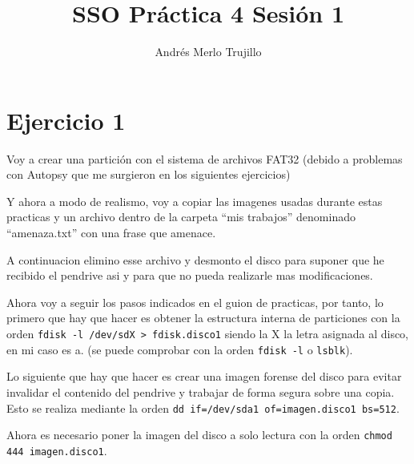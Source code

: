 \documentclass{article}
\title{SSO Práctica 4 Sesión 1}
\author{Andrés Merlo Trujillo}
\date{}
\begin{document}
\maketitle

\tableofcontents

\newpage

\section*{Ejercicio 1}

Voy a crear una partición con el sistema de archivos FAT32 (debido a problemas con Autopsy que me surgieron en los siguientes ejercicios)

Y ahora a modo de realismo, voy a copiar las imagenes usadas durante estas practicas y un archivo dentro de la carpeta ``mis trabajos'' denominado ``amenaza.txt'' con una frase que amenace.


A continuacion elimino esse archivo y desmonto el disco para suponer que he recibido el pendrive asi y para que no pueda realizarle mas modificaciones.

Ahora voy a seguir los pasos indicados en el guion de practicas, por tanto, lo primero que hay que hacer es obtener la estructura interna de particiones con la orden \verb|fdisk -l /dev/sdX > fdisk.disco1| siendo la X la letra asignada al disco, en mi caso es a. (se puede comprobar con la orden \verb|fdisk -l| o \verb|lsblk|).


Lo siguiente que hay que hacer es crear una imagen forense del disco para evitar invalidar el contenido del pendrive y trabajar de forma segura sobre una copia. Esto se realiza mediante la orden \verb|dd if=/dev/sda1 of=imagen.disco1 bs=512|.


Ahora es necesario poner la imagen del disco a solo lectura con la orden \verb|chmod 444 imagen.disco1|.
\end{document}

